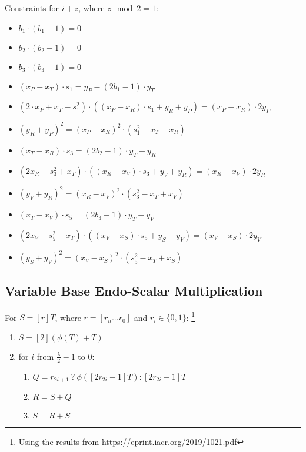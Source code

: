Constraints for $i + z$, where $z\mod 2 = 1$:
\begin{itemize}
    \item $b_1 \cdot (b_1 - 1) = 0$
    \item $b_2 \cdot (b_2 - 1) = 0$
    \item $b_3 \cdot (b_3 - 1) = 0$
    \item $(x_P - x_T) \cdot s_1 = y_P - (2b_1 - 1) \cdot y_T$
    \item $(2 \cdot x_P + x_T - s_1^2) \cdot ((x_P - x_R) \cdot s_1 + y_R + y_P) = (x_P - x_R) \cdot 2y_P$\
    \item $(y_R + y_P)^2 = (x_P - x_R)^2 \cdot (s_1^2 - x_T + x_R)$
    \item $(x_T - x_R) \cdot s_3 = (2b_2 - 1) \cdot y_T - y_R$
    \item $(2x_R - s_3^2 + x_T) \cdot ((x_R - x_V) \cdot s_3 + y_V + y_R) = (x_R - x_V) \cdot 2y_R$
    \item $(y_V + y_R)^2 = (x_R - x_V)^2 \cdot (s_3^2 - x_T + x_V)$
    \item $(x_T - x_V) \cdot s_5 = (2b_3 - 1) \cdot y_T - y_V$
    \item $(2x_V - s_5^2 + x_T) \cdot ((x_V - x_S) \cdot s_5 + y_S + y_V) = (x_V - x_S) \cdot 2y_V$
    \item $(y_S + y_V)^2 = (x_V - x_S)^2 \cdot (s_5^2 - x_T + x_S)$
\end{itemize}

\subsection{Variable Base Endo-Scalar Multiplication}

For $S  = [r]T$, where $r = [r_n ... r_0]$ and $r_i \in \{0, 1\}$:
\footnote{Using the results from \url{https://eprint.iacr.org/2019/1021.pdf}}
\begin{enumerate}
    \item $S = [2](\phi(T) + T)$
    \item for $i$ from $\frac{\lambda}{2} - 1$ to $0$:
    \begin{enumerate}
        \item $Q = r_{2i + 1} \: ? \: \phi([2r_{2i} - 1]T) : [2r_{2i} - 1]T$
        \item $R = S + Q$
        \item $S = R + S$
    \end{enumerate}
\end{enumerate}

